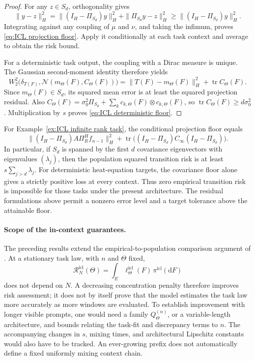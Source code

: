 \begin{proof}
For any \(z\in S_d\), orthogonality gives
\[
\|y-z\|_H^2
=\|(I_H-\Pi_{S_d})y\|_H^2+\|\Pi_{S_d}y-z\|_H^2
\geqslant\|(I_H-\Pi_{S_d})y\|_H^2.
\]
Integrating against any coupling of \(\mu\) and \(\nu\), and taking the infimum, proves \eqref{eq:ICL projection floor}. Apply it conditionally at each task context and average to obtain the risk bound.

For a deterministic task output, the coupling with a Dirac measure is unique. The Gaussian second-moment identity therefore yields
\[
W_2^2\bigl(\delta_{T(F)},\mathcal N(m_\Theta(F),C_\Theta(F))\bigr)
=\|T(F)-m_\Theta(F)\|_H^2+\operatorname{tr}C_\Theta(F).
\]
Since \(m_\Theta(F)\in S_d\), its squared mean error is at least the squared projection residual. Also \(C_\Theta(F)=\sigma_0^2\Pi_{S_d}+\sum_kc_{k,\Theta}(F)\otimes c_{k,\Theta}(F)\), so \(\operatorname{tr}C_\Theta(F)\geqslant d\sigma_0^2\). Multiplication by \(s\) proves \eqref{eq:ICL deterministic floor}.
\end{proof}

For Example~\ref{ex:ICL infinite rank task}, the conditional projection floor equals
\[
\|(I_H-\Pi_{S_d})A\Pi_R^Hf_{n-1}\|_H^2
+\operatorname{tr}\bigl((I_H-\Pi_{S_d})C_\infty(I_H-\Pi_{S_d})\bigr).
\]
In particular, if \(S_d\) is spanned by the first \(d\) covariance eigenvectors with eigenvalues \((\lambda_j)\), then the population squared transition risk is at least \(s\sum_{j>d}\lambda_j\). For deterministic heat-equation targets, the covariance floor alone gives a strictly positive loss at every context. Thus zero empirical transition risk is impossible for those tasks under the present architecture. The residual formulations above permit a nonzero error level and a target tolerance above the attainable floor.

\paragraph{Scope of the in-context guarantees.}

The preceding results extend the empirical-to-population comparison argument of \cite[Section~6]{ZekriEtAl2025}. At a stationary task law, with \(n\) and \(\Theta\) fixed,
\[
\mathcal R_N^{\mathrm{icl}}(\Theta)
=\int_E\ell_\Theta^{\mathrm{icl}}(F)\,\pi^{\mathrm{icl}}(\mathrm dF)
\]
does not depend on \(N\). A decreasing concentration penalty therefore improves risk assessment; it does not by itself prove that the model estimates the task law more accurately as more windows are evaluated. To establish improvement with longer visible prompts, one would need a family \(Q_\Theta^{(n)}\), or a variable-length architecture, and bounds relating the task-fit and discrepancy terms to \(n\). The accompanying changes in \(s\), mixing times, and architectural Lipschitz constants would also have to be tracked. An ever-growing prefix does not automatically define a fixed uniformly mixing context chain.

